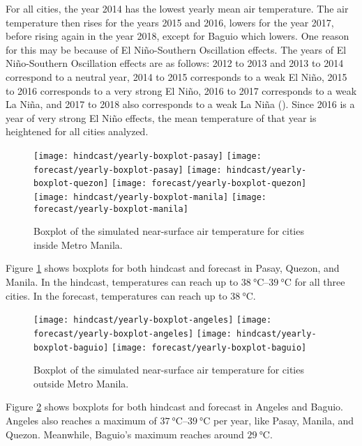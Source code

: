 	For all cities, the year 2014 has the lowest yearly mean air temperature.
	The air temperature then rises for the years 2015 and 2016,
		lowers for the year 2017,
		before rising again in the year 2018,
			except for Baguio which lowers.
	One reason for this may be because of El Niño-Southern Oscillation effects.
	The years of El Niño-Southern Oscillation effects are as follows:
		2012 to 2013 and 2013 to 2014 correspond to a neutral year,
		2014 to 2015 corresponds to a weak El Niño,
		2015 to 2016 corresponds to a very strong El Niño,
		2016 to 2017 corresponds to a weak La Niña,
		and
		2017 to 2018 also corresponds to a weak La Niña
		(\cite{Null2025}).
	Since 2016 is a year of very strong El Niño effects, the mean temperature of that year is heightened for all cities analyzed.

	\begin{figure}	
		\centering
		\texttt{[image: hindcast/yearly-boxplot-pasay]}
		\texttt{[image: forecast/yearly-boxplot-pasay]}
		\texttt{[image: hindcast/yearly-boxplot-quezon]}
		\texttt{[image: forecast/yearly-boxplot-quezon]}			
		\texttt{[image: hindcast/yearly-boxplot-manila]}
		\texttt{[image: forecast/yearly-boxplot-manila]}			
		\caption{
			Boxplot of the simulated near-surface air temperature for cities inside Metro Manila.
		}
		\label{fig:yearly-boxplot-inside-mm}
	\end{figure}

	Figure \ref{fig:yearly-boxplot-inside-mm} shows boxplots for both hindcast and forecast in Pasay, Quezon, and Manila.
	In the hindcast, temperatures can reach up to $\qtyrange{38}{39}{\degreeCelsius}$ for all three cities.
	In the forecast, temperatures can reach up to $\qty{38}{\degreeCelsius}$.

	\begin{figure}	
		\centering
		\texttt{[image: hindcast/yearly-boxplot-angeles]}
		\texttt{[image: forecast/yearly-boxplot-angeles]}
		\texttt{[image: hindcast/yearly-boxplot-baguio]}
		\texttt{[image: forecast/yearly-boxplot-baguio]}		
		\caption{
			Boxplot of the simulated near-surface air temperature for cities outside Metro Manila.
		}
		\label{fig:yearly-boxplot-outside-mm}
	\end{figure}

	Figure \ref{fig:yearly-boxplot-outside-mm} shows boxplots for both hindcast and forecast in Angeles and Baguio.
	Angeles also reaches a maximum of $\qtyrange{37}{39}{\degreeCelsius}$ per year, like Pasay, Manila, and Quezon.
	Meanwhile, Baguio's maximum reaches around $\qty{29}{\degreeCelsius}$. 
 
